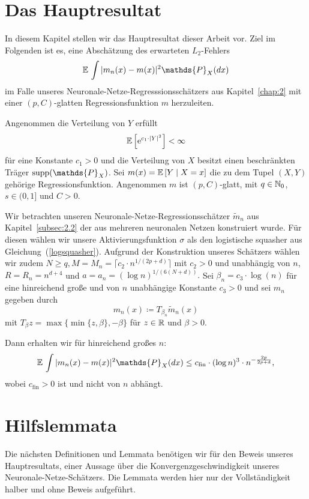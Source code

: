 \section{Das Hauptresultat}
In diesem Kapitel stellen wir das Hauptresultat dieser Arbeit vor.
Ziel im Folgenden ist es, eine Abschätzung des erwarteten $L_2$-Fehlers 
$$\E \int |m_n(x) - m(x)|^2  \mathds{P}_X(dx)$$
im Falle unseres Neuronale-Netze-Regresssionsschätzers aus Kapitel~\ref{chap:2} mit einer $(p,C)$-glatten Regressionsfunktion $m$ herzuleiten.

\begin{thm}\label{optstop}
Angenommen die Verteilung von $Y$ erfüllt 
$$ \mathbb{E}\,\Big[\mathrm{e}^{c_1 \cdot |Y|^2}\Big] < \infty$$
für eine Konstante $c_1 > 0$ und die Verteilung von $X$ besitzt einen beschränkten Träger $\supp(\mathds{P}_X)$. Sei $m(x) = \mathbb{E}\,[Y \mid X = x]$ die zu dem Tupel $(X, Y)$ gehörige Regressionsfunktion.
Angenommen $m$ ist $(p,C)$-glatt, mit $q \in \mathbb{N}_0$, $s \in (0,1]$ und $C > 0$. 

Wir betrachten unseren Neuronale-Netze-Regressionsschätzer $\tilde{m}_n$ aus Kapitel~\ref{subsec:2.2} der aus mehreren neuronalen Netzen konstruiert wurde. Für diesen wählen wir unsere Aktivierungsfunktion $\sigma$ als den logistische squasher aus Gleichung~(\ref{logsquasher}). Aufgrund der Konstruktion unseres Schätzers wählen wir zudem $N \geq q, M = M_n = \lceil c_2 \cdot n^{1/(2p + d)}\rceil$ mit $c_2 >0$ und unabhängig von $n$, $R = R_n = n^{d + 4}$ und $a = a_n = (\log n)^{1/(6(N + d))}.$
Sei $\beta_n = c_3 \cdot \log(n)$ für eine hinreichend große und von $n$ unabhängige Konstante $c_3 > 0$ und sei $m_n$ gegeben durch
$$m_n(x) \coloneqq T_{\beta_n}\tilde{m}_n (x)$$
mit $T_{\beta}z = \max\{\min\{z, \beta\}, -\beta\}$ für $z \in \mathbb{R}$ und $\beta > 0.$ 

Dann erhalten wir für hinreichend großes $n$:
$$\E \int |m_n(x) - m(x)|^2  \mathds{P}_X(dx) \leq c_{\text{fin}} \cdot (\log n)^3 \cdot n^{- \frac{2p}{2p + d}},$$
wobei $c_{\text{fin}} > 0$ ist und nicht von $n$ abhängt.
\end{thm}

\section{Hilfslemmata}
Die nächsten  Definitionen und Lemmata benötigen wir für den Beweis unseres Hauptresultats, einer Aussage über die Konvergenzgeschwindigkeit unseres Neuronale-Netze-Schätzers. Die Lemmata werden hier nur der Vollständigkeit halber und ohne Beweis aufgeführt. 

